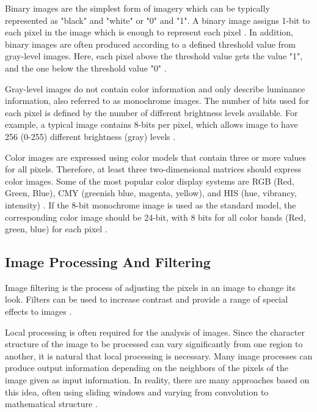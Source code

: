Binary images are the simplest form of imagery which can be typically represented as "black" and "white" or "0" and "1". A binary image assigns 1-bit to each pixel in the image which is enough to represent each pixel \cite{umbaugh2005computer, costa2000shape}. In addition, binary images are often produced according to a defined threshold value from gray-level images. Here, each pixel above the threshold value gets the value "1", and the one below the threshold value "0" \cite{umbaugh2005computer, costa2000shape}.

Gray-level images do not contain color information and only describe luminance information, also referred to as monochrome images. The number of bits used for each pixel is defined by the number of different brightness levels available. For example, a typical image contains 8-bits per pixel, which allows image to have 256 (0-255) different brightness (gray) levels \cite{umbaugh2005computer, costa2000shape}.

Color images are expressed using color models that contain three or more values for all pixels. Therefore, at least three two-dimensional matrices should express color images. Some of the most popular color display systems are RGB (Red, Green, Blue), CMY (greenish blue, magenta, yellow), and HIS (hue, vibrancy, intensity) \cite{costa2000shape}. If the 8-bit monochrome image is used as the standard model, the corresponding color image should be 24-bit, with 8 bits for all color bands (Red, green, blue) for each pixel \cite{umbaugh2005computer}.

\subsection{Image Processing And Filtering}

Image filtering is the process of adjusting the pixels in an image to change its look. Filters can be used to increase contrast and provide a range of special effects to images \cite{costa2000shape}.

Local processing is often required for the analysis of images. Since the character structure of the image to be processed can vary significantly from one region to another, it is natural that local processing is necessary. Many image processes can produce output information depending on the neighbors of the pixels of the image given as input information. In reality, there are many approaches based on this idea, often using sliding windows and varying from convolution to mathematical structure \cite{costa2000shape}.

